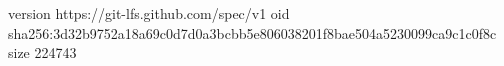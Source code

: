 version https://git-lfs.github.com/spec/v1
oid sha256:3d32b9752a18a69c0d7d0a3bcbb5e806038201f8bae504a5230099ca9c1c0f8c
size 224743
